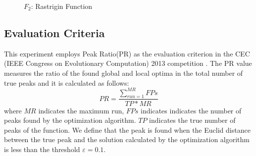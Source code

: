 \documentclass{ies2018}
\begin{document}
\begin{figure}[h]
\centering
{}

\caption{$F_2$: Rastrigin Function}
\label{fig:f2}
\end{figure}

\subsection{Evaluation Criteria}
This experiment employs Peak Ratio(PR) \cite{crowdingDE} as the evaluation criterion in the CEC (IEEE Congress on Evolutionary Computation) 2013 competition \cite{cec2013}. The PR value measures the ratio of the found global and local optima in the total number of true peaks and it is calculated as follows: 
\begin{equation}
\label{eq:PR}
PR=\frac{\sum_{run=1}^{MR}FPs}{TP*MR}
\end{equation}
 where ${MR}$ indicates the maximum run, ${FPs}$ indicates  indicates the number of peaks found by the optimization algorithm. ${TP}$ indicates the true number of peaks of the function. We define that the peak is found when the Euclid distance between the true peak and the solution calculated by the optimization algorithm is less than the threshold $\varepsilon = 0.1$.
\end{document}
